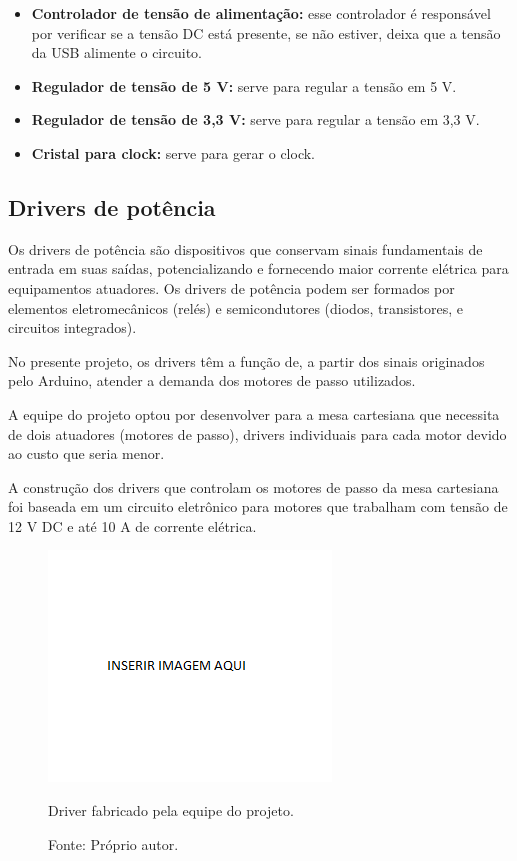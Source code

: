 \begin{itemize}
\item \textbf{Controlador de tensão de alimentação:} esse controlador é responsável por verificar se a tensão DC está presente, se não estiver, deixa que a tensão da USB alimente o circuito. 
\item \textbf{Regulador de tensão de 5 V:} serve para regular a tensão em 5 V.
\item \textbf{Regulador de tensão de 3,3 V:} serve para regular a tensão em 3,3 V.
\item \textbf{Cristal para clock:} serve para gerar o clock.
\end{itemize}

\subsection{Drivers de potência}\label{subsec:metdriver}

Os drivers de potência são dispositivos que conservam sinais fundamentais de entrada em suas saídas, 
potencializando e fornecendo maior corrente elétrica para equipamentos atuadores. Os drivers de potência 
podem ser formados por elementos eletromecânicos (relés) e semicondutores (diodos, transistores, e 
circuitos integrados). 

No presente projeto, os drivers têm a função de, a partir dos sinais originados pelo Arduino, atender 
a demanda dos motores de passo utilizados.

A equipe do projeto optou por desenvolver para a mesa cartesiana que necessita de dois atuadores 
(motores de passo), drivers individuais para cada motor devido ao custo que seria menor.

A construção dos drivers que controlam os motores de passo da mesa cartesiana foi baseada em um 
circuito eletrônico para motores que trabalham com tensão de 12 V DC e até 10 A de corrente elétrica. 

\begin{figure}[!htb]
\centering
\includegraphics[scale = 0.2]{figuras/3-13}
\caption{Driver fabricado pela equipe do projeto.}
\caption*{Fonte: Próprio autor.}
\label{fig:driver}
\end{figure}
    
